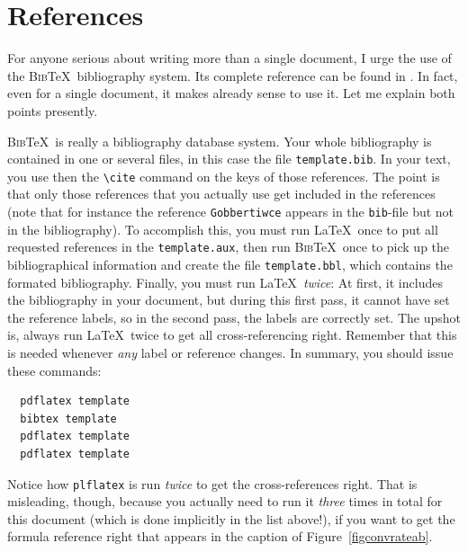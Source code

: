 \documentclass[12pt]{article}
\numberwithin{equation}{section}
\numberwithin{table}{section}
\numberwithin{figure}{section}
\begin{document}
\section{References} \label{secreferences}

For anyone serious about writing more than a single document, I urge
the use of the \textsc{Bib}\TeX\ bibliography system. Its complete
reference can be found in \cite[Appendix B]{Lamport94}.
In fact, even for a single document, it makes already sense to use it.
Let me explain both points presently.

\textsc{Bib}\TeX\ is really a bibliography database system. Your whole
bibliography is contained in one or several files, in this case the file
\verb+template.bib+. In your text, you use then the \verb+\cite+ command
on the keys of those references. The point is that only those references
that you actually use get included in the references (note that for
instance the reference \verb+Gobbertiwce+ appears in the \verb+bib+-file
but not in the bibliography). To accomplish this,
you must run \LaTeX\ once to put all requested references in the
\verb+template.aux+, then run \textsc{Bib}\TeX\ once to pick up the
bibliographical information and create the file \verb+template.bbl+,
which contains the formated bibliography. Finally, you must run \LaTeX\
\emph{twice}: At first, it includes the bibliography in your document,
but during this first pass, it cannot have set the reference labels,
so in the second pass, the labels are correctly set. The upshot is,
always run \LaTeX\ twice to get all cross-referencing right. Remember
that this is needed whenever \emph{any} label or reference changes.
In summary, you should issue these commands:
\begin{verbatim}
  pdflatex template
  bibtex template
  pdflatex template
  pdflatex template
\end{verbatim}
Notice how \verb+plflatex+ is run \emph{twice} to get the cross-references
right. That is misleading, though, because you actually need to run
it \emph{three} times in total for this document
(which is done implicitly in the list above!),
if you want to get the formula reference right that appears in the caption
of Figure~\ref{figconvrateab}.
\end{document}
